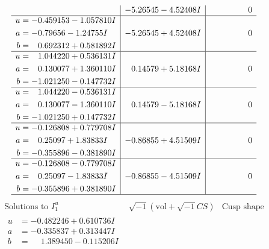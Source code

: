\documentclass[1p]{elsarticle_modified}
\theoremstyle{definition}
\newcommand{\I}{\sqrt{-1}}
\begin{document}
$$\begin{array}{c|c|c}
 & -5.26545 - 4.52408 I & \phantom{-0.000000 } 0 \\ \hline\begin{aligned}
u &= -0.459153 - 1.057810 I \\
a &= -0.79656 - 1.24755 I \\
b &= \phantom{-}0.692312 + 0.581892 I\end{aligned}
 & -5.26545 + 4.52408 I & \phantom{-0.000000 } 0 \\ \hline\begin{aligned}
u &= \phantom{-}1.044220 + 0.536131 I \\
a &= \phantom{-}0.130077 + 1.360110 I \\
b &= -1.021250 - 0.147732 I\end{aligned}
 & \phantom{-}0.14579 + 5.18168 I & \phantom{-0.000000 } 0 \\ \hline\begin{aligned}
u &= \phantom{-}1.044220 - 0.536131 I \\
a &= \phantom{-}0.130077 - 1.360110 I \\
b &= -1.021250 + 0.147732 I\end{aligned}
 & \phantom{-}0.14579 - 5.18168 I & \phantom{-0.000000 } 0 \\ \hline\begin{aligned}
u &= -0.126808 + 0.779708 I \\
a &= \phantom{-}0.25097 + 1.83833 I \\
b &= -0.355896 - 0.381890 I\end{aligned}
 & -0.86855 + 4.51509 I & \phantom{-0.000000 } 0 \\ \hline\begin{aligned}
u &= -0.126808 - 0.779708 I \\
a &= \phantom{-}0.25097 - 1.83833 I \\
b &= -0.355896 + 0.381890 I\end{aligned}
 & -0.86855 - 4.51509 I & \phantom{-0.000000 } 0\\
 \hline 
 \end{array}$$\newpage$$\begin{array}{c|c|c}  
\text{Solutions to }I^u_{1}& \I (\text{vol} + \sqrt{-1}CS) & \text{Cusp shape}\\
 \hline 
\begin{aligned}
u &= -0.482246 + 0.610736 I \\
a &= -0.335837 + 0.313447 I \\
b &= \phantom{-}1.389450 - 0.115206 I\end{aligned}

\end{array}$$
\end{document}
